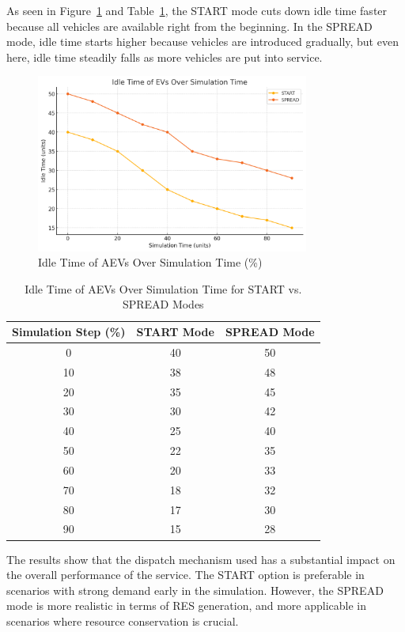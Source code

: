 As seen in Figure~\ref{fig:idle_time_img} and Table~\ref{tab:idle_time_tab}, the START mode cuts down idle time faster because all vehicles are available right from the beginning. In the SPREAD mode, idle time starts higher because vehicles are introduced gradually, but even here, idle time steadily falls as more vehicles are put into service.

\begin{figure}[h!]
    \centering
    \includegraphics[width=0.8\textwidth]{Crest/Images/idle_time.png}
    \caption{Idle Time of AEVs Over Simulation Time (\%)}
    \label{fig:idle_time_img}
\end{figure}

\begin{table}[h!]
\centering
\begin{tabular}{|c|c|c|}
\hline
\textbf{Simulation Step (\%)} & \textbf{START Mode} & \textbf{SPREAD Mode} \\ \hline
0  & 40  & 50  \\
10 & 38  & 48  \\ 
20 & 35  & 45  \\ 
30 & 30  & 42  \\ 
40 & 25  & 40  \\ 
50 & 22  & 35  \\ 
60 & 20  & 33  \\ 
70 & 18  & 32  \\ 
80 & 17  & 30  \\ 
90 & 15  & 28  \\ \hline
\end{tabular}
\caption{Idle Time of AEVs Over Simulation Time for START vs. SPREAD Modes}
\label{tab:idle_time_tab}
\end{table}


The results show that the dispatch mechanism used has a substantial impact on the overall performance of the service. The START option is preferable in scenarios with strong demand early in the simulation. However, the SPREAD mode is more realistic in terms of RES generation, and more applicable in scenarios where resource conservation is crucial.

